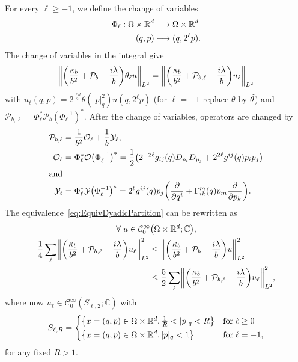 \documentclass[AHL,Unicode,longabstracts]{cedram}
\newcommand{\C}{\mathbb{C}}
\newcommand{\R}{\mathbb{R}}
\newcommand{\clC}{\mathcal{C}}
\newcommand{\clY}{\mathcal{Y}}
\newcommand{\clO}{\mathcal{O}}
\newcommand{\clP}{\mathcal{P}}
\let\oldtilde\tilde
\renewcommand*{\tilde}[1]{\mathchoice{\widetilde{#1}}{\widetilde{#1}}{\oldtilde{#1}}{\oldtilde{#1}}}
\let\oldforall\forall
\renewcommand*{\forall}{\mathrel{\oldforall}}
\let\originalleft\left
\let\originalright\right
\renewcommand{\left}{\mathopen{}\mathclose\bgroup\originalleft}
\renewcommand{\right}{\aftergroup\egroup\originalright}
\renewcommand*{\to}{\mathchoice{\longrightarrow}{\rightarrow}{\rightarrow}{\rightarrow}}
\let\oldmapsto\mapsto
\renewcommand*{\mapsto}{\mathchoice{\longmapsto}{\oldmapsto}{\oldmapsto}{\oldmapsto}}
\begin{document}
For every $\ell \geq -1$, we define the change of variables
\begin{align*}
\Phi_{\ell}:
\Omega\times\R^d &\to \Omega\times \R^d \\
(q,p) &\mapsto (q,2^{\ell}p).
\end{align*}
The change of variables in the integral give
\begin{equation}
\left\|\left(\frac{\kappa_{b}}{b^{2}}+\clP_{b}-\frac{i\lambda}{b}\right)\theta_{\ell}u\right\|_{L^2}=\left \| \left(\frac{\kappa_{b}}{b^{2}}+\clP_{b,\ell}-\frac{i\lambda}{b}\right)u_{\ell}\right\|_{L^2}
\end{equation}
with $ u_{\ell}(q,p) = 2^{\frac{\ell d}{2}}\theta(|p|^{2}_q)u(q,2^{\ell}p)$ (for $\ell=-1$ replace $\theta$ by $\tilde{\theta}$) and $\clP_{b,\ell}=\Phi_{\ell}^{*}\clP_{b}(\Phi_{\ell}^{-1})^{*}. $ After the change of variables, operators are changed by
\begin{align}
\clP_{b,\ell} &= \frac{1}{b^{2}} \clO_{\ell} + \frac{1}{b}\clY_{\ell}, \label{eq:defPbell}\\
\clO_{\ell} &=\Phi_{\ell}^{*}\clO\left(\Phi_{\ell}^{-1}\right)^{*} = \frac{1}{2}\left(2^{-2\ell}g_{ij}(q)D_{p_{i}}D_{p_{j}}+2^{2\ell}g^{ij}(q)p_{i}p_{j}\right)\label{eq:defOell}\\
\intertext{and}
\clY_{\ell} &= \Phi_{\ell}^{*}\clY\left(\Phi_{\ell}^{-1}\right)^{*}= 2^{\ell} g^{ij}(q) p_{j}\left(\frac{\partial}{\partial q^{i}} + \Gamma^{m}_{ik}(q)p_{m}\frac{\partial}{\partial p_{k}}\right).
\label{eq:defYell}
\end{align}
The equivalence~\eqref{eq:EquivDyadicPartition} can be rewritten as
\begin{multline}\label{eq:equivcalPbell}
\forall u\in \clC^{\infty}_{0}\left(\Omega \times \R^d;\C\right),\\
\begin{aligned}
\frac{1}{4} \sum_\ell \left\| \left(\frac{\kappa_b}{b^2} + \clP_{b,\ell} - \frac{i \lambda}{b}\right) u_{\ell}\right\|^2_{L^2} &\leq \left\|\left(\frac{\kappa_b}{b^2} + \clP_b - \frac{i \lambda}{b}\right) u \right\|^2_{L^2}\\
&\leq \frac{5}{2}\sum_\ell \left\| \left(\frac{\kappa_b}{b^2} + \clP_{b,\ell} - \frac{i \lambda}{b}\right) u_{\ell}\right\|^2_{L^2},
\end{aligned}
\end{multline}
where now $u_\ell\in \clC^{\infty}_{0}(S_{\ell,2};\C)$ with
\begin{equation}\label{eq:defSell}
S_{\ell,R}=
\begin{cases}
\left\{x=(q,p)\in\Omega\times\R^d, \frac{1}{R}< |p|_q <R
\right\}&\text{for}\;\ell\geq 0\\[0.20em]
\left\{x=(q,p)\in\Omega\times \R^d, |p|_q< 1\right\}&\text{for}\;\ell=-1,
\end{cases}
\end{equation}
for any fixed $R>1$.
\end{document}
